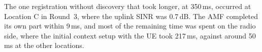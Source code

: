 The one registration without discovery that took longer, at 350\,ms, occurred at Location C in Round~3, where the uplink \gls{SINR} was 0.7\,dB. The \gls{AMF} completed its own part within 9\,ms, and most of the remaining time was spent on the radio side, where the initial context setup with the \gls{UE} took 217\,ms, against around 50\,ms at the other locations.
